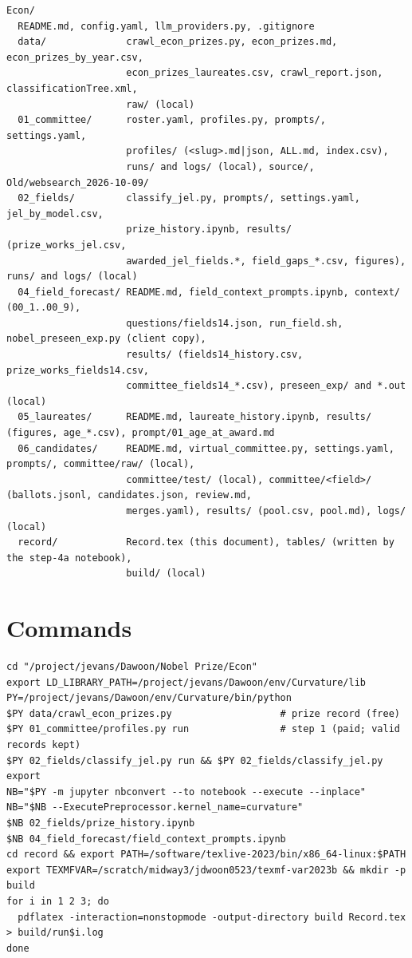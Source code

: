 \documentclass[11pt,a4paper]{article}
\begin{document}
\begin{footnotesize}
\begin{verbatim}
Econ/
  README.md, config.yaml, llm_providers.py, .gitignore
  data/              crawl_econ_prizes.py, econ_prizes.md, econ_prizes_by_year.csv,
                     econ_prizes_laureates.csv, crawl_report.json, classificationTree.xml,
                     raw/ (local)
  01_committee/      roster.yaml, profiles.py, prompts/, settings.yaml,
                     profiles/ (<slug>.md|json, ALL.md, index.csv),
                     runs/ and logs/ (local), source/, Old/websearch_2026-10-09/
  02_fields/         classify_jel.py, prompts/, settings.yaml, jel_by_model.csv,
                     prize_history.ipynb, results/ (prize_works_jel.csv,
                     awarded_jel_fields.*, field_gaps_*.csv, figures), runs/ and logs/ (local)
  04_field_forecast/ README.md, field_context_prompts.ipynb, context/ (00_1..00_9),
                     questions/fields14.json, run_field.sh, nobel_preseen_exp.py (client copy),
                     results/ (fields14_history.csv, prize_works_fields14.csv,
                     committee_fields14_*.csv), preseen_exp/ and *.out (local)
  05_laureates/      README.md, laureate_history.ipynb, results/ (figures, age_*.csv), prompt/01_age_at_award.md
  06_candidates/     README.md, virtual_committee.py, settings.yaml, prompts/, committee/raw/ (local),
                     committee/test/ (local), committee/<field>/ (ballots.jsonl, candidates.json, review.md,
                     merges.yaml), results/ (pool.csv, pool.md), logs/ (local)
  record/            Record.tex (this document), tables/ (written by the step-4a notebook),
                     build/ (local)
\end{verbatim}
\end{footnotesize}

\section{Commands}

\begin{footnotesize}
\begin{verbatim}
cd "/project/jevans/Dawoon/Nobel Prize/Econ"
export LD_LIBRARY_PATH=/project/jevans/Dawoon/env/Curvature/lib
PY=/project/jevans/Dawoon/env/Curvature/bin/python
$PY data/crawl_econ_prizes.py                   # prize record (free)
$PY 01_committee/profiles.py run                # step 1 (paid; valid records kept)
$PY 02_fields/classify_jel.py run && $PY 02_fields/classify_jel.py export
NB="$PY -m jupyter nbconvert --to notebook --execute --inplace"
NB="$NB --ExecutePreprocessor.kernel_name=curvature"
$NB 02_fields/prize_history.ipynb
$NB 04_field_forecast/field_context_prompts.ipynb
cd record && export PATH=/software/texlive-2023/bin/x86_64-linux:$PATH
export TEXMFVAR=/scratch/midway3/jdwoon0523/texmf-var2023b && mkdir -p build
for i in 1 2 3; do
  pdflatex -interaction=nonstopmode -output-directory build Record.tex > build/run$i.log
done
\end{verbatim}
\end{footnotesize}
\end{document}
